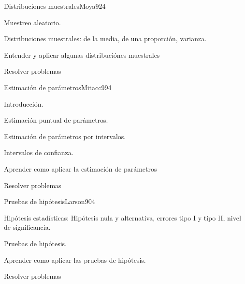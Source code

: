 \begin{syllabus}
\begin{unit}{Distribuciones muestrales}{Moya92}{4}
   \begin{topics}
         \item  Muestreo aleatorio.
	 \item  Distribuciones muestrales: de la media, de una proporción, varianza.
   \end{topics}

   \begin{learningoutcomes}
         \item  Entender y aplicar algunas distribuciónes muestrales
         \item  Resolver problemas
   \end{learningoutcomes}
\end{unit}

\begin{unit}{Estimación de parámetros}{Mitacc99}{4}
   \begin{topics}
         \item  Introducción.
	 \item  Estimación puntual de parámetros.
	\item Estimación de parámetros por intervalos.
	\item Intervalos de confianza.
   \end{topics}

   \begin{learningoutcomes}
         \item  Aprender como aplicar la estimación de parámetros
         \item  Resolver problemas
   \end{learningoutcomes}
\end{unit}

\begin{unit}{Pruebas de hipótesis}{Larson90}{4}
   \begin{topics}
         \item  Hipótesis estadísticas: Hipótesis nula y alternativa, errores tipo I y tipo II, nivel de significancia.
	 \item  Pruebas de hipótesis.
   \end{topics}

   \begin{learningoutcomes}
         \item  Aprender como aplicar las pruebas de hipótesis.
         \item  Resolver problemas
   \end{learningoutcomes}
\end{unit}

\begin{coursebibliography}
\end{coursebibliography}

\end{syllabus}
